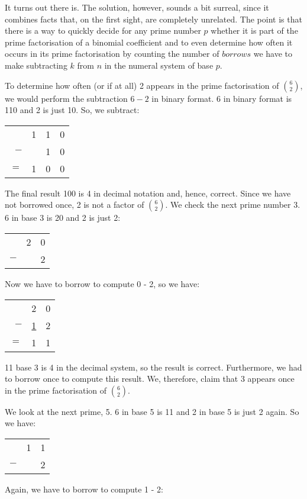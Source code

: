 \documentclass[tikz]{scrreprt}
\begin{document}
It turns out there is.
The solution, however,
sounds a bit surreal,
since it combines facts
that, on the first sight, are completely
unrelated.
The point is that there is a way
to quickly decide for any
prime number $p$ whether it is part
of the prime factorisation of a 
binomial coefficient and
to even determine how often it occurs
in its prime factorisation by counting
the number of $borrows$ we have to make
subtracting $k$ from $n$ in the numeral system
of base $p$.

To determine how often (or if at all) 
2 appears in the prime factorisation of $\binom{6}{2}$,
we would perform the subtraction $6-2$ in
binary format.
6 in binary format is 110 and
2 is just 10.
So, we subtract:

\begin{tabular}{r r r r}
    & 1 & 1 & 0 \\
$-$ &   & 1 & 0 \\
$=$ & 1 & 0 & 0
\end{tabular}

The final result 100 is 4
in decimal notation and, hence, correct.
Since we have not borrowed once,
2 is not a factor of $\binom{6}{2}$.
We check the next prime number 3.
6 in base 3 is 20 and 2 is just 2:

\begin{tabular}{r r r}
    & 2 & 0 \\
$-$ &   & 2 
\end{tabular}

Now we have to borrow
to compute 0 - 2,
so we have:

\begin{tabular}{r r r}
    & 2             & 0 \\
$-$ & \underline{1} & 2 \\
$=$ & 1             & 1 
\end{tabular}

11 base 3 is 4 in the decimal system,
so the result is correct.
Furthermore, we had to borrow once
to compute this result.
We, therefore, claim that 3 appears once
in the prime factorisation of $\binom{6}{2}$.

We look at the next prime, 5.
6 in base 5 is 11 and 2 in base 5 is just 2 again.
So we have:

\begin{tabular}{r r r}
    & 1 & 1 \\
$-$ &   & 2 
\end{tabular}

Again, we have to borrow
to compute 1 - 2:
\end{document}
